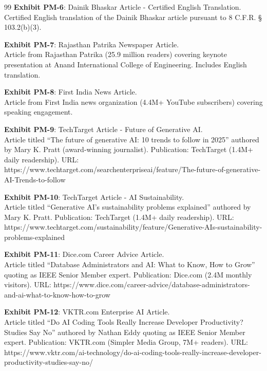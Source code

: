 \documentclass[11pt]{article}
\begin{document}
\begin{thebibliography}{99}
\textbf{Exhibit PM-6}: Dainik Bhaskar Article - Certified English Translation.
\\Certified English translation of the Dainik Bhaskar article pursuant to 8 C.F.R. § 103.2(b)(3).

\textbf{Exhibit PM-7}: Rajasthan Patrika Newspaper Article.
\\Article from Rajasthan Patrika (25.9 million readers) covering \drs keynote presentation at Anand International College of Engineering. Includes English translation.

\textbf{Exhibit PM-8}: First India News Article.
\\Article from First India news organization (4.4M+ YouTube subscribers) covering \drs speaking engagement.

\textbf{Exhibit PM-9}: TechTarget Article - Future of Generative AI.
\\Article titled ``The future of generative AI: 10 trends to follow in 2025'' authored by Mary K. Pratt (award-winning journalist). Publication: TechTarget (1.4M+ daily readership). URL: https://www.techtarget.com/searchenterpriseai/feature/The-future-of-generative-AI-Trends-to-follow

\textbf{Exhibit PM-10}: TechTarget Article - AI Sustainability.
\\Article titled ``Generative AI's sustainability problems explained'' authored by Mary K. Pratt. Publication: TechTarget (1.4M+ daily readership). URL: https://www.techtarget.com/sustainability/feature/Generative-AIs-sustainability-problems-explained

\textbf{Exhibit PM-11}: Dice.com Career Advice Article.
\\Article titled ``Database Administrators and AI: What to Know, How to Grow'' quoting \dr as IEEE Senior Member expert. Publication: Dice.com (2.4M monthly visitors). URL: https://www.dice.com/career-advice/database-administrators-and-ai-what-to-know-how-to-grow

\textbf{Exhibit PM-12}: VKTR.com Enterprise AI Article.
\\Article titled ``Do AI Coding Tools Really Increase Developer Productivity? Studies Say No'' authored by Nathan Eddy quoting \dr as IEEE Senior Member expert. Publication: VKTR.com (Simpler Media Group, 7M+ readers). URL: https://www.vktr.com/ai-technology/do-ai-coding-tools-really-increase-developer-productivity-studies-say-no/


\end{thebibliography}
\end{document}
